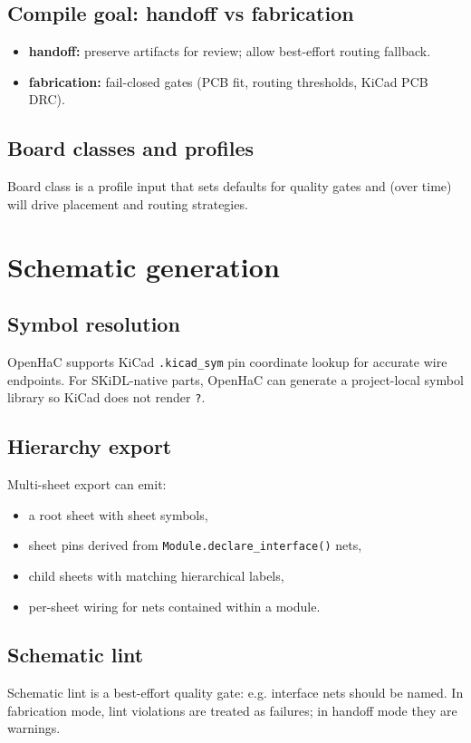 \documentclass[11pt]{report}
\begin{document}
\section{Compile goal: handoff vs fabrication}
\begin{itemize}
  \item \textbf{handoff:} preserve artifacts for review; allow best-effort routing fallback.
  \item \textbf{fabrication:} fail-closed gates (PCB fit, routing thresholds, KiCad PCB DRC).
\end{itemize}

\section{Board classes and profiles}
Board class is a profile input that sets defaults for quality gates and (over time) will drive
placement and routing strategies.

\chapter{Schematic generation}

\section{Symbol resolution}
OpenHaC supports KiCad \texttt{.kicad\_sym} pin coordinate lookup for accurate wire endpoints.
For SKiDL-native parts, OpenHaC can generate a project-local symbol library so KiCad does not render \texttt{?}.

\section{Hierarchy export}
Multi-sheet export can emit:
\begin{itemize}
  \item a root sheet with sheet symbols,
  \item sheet pins derived from \texttt{Module.declare\_interface()} nets,
  \item child sheets with matching hierarchical labels,
  \item per-sheet wiring for nets contained within a module.
\end{itemize}

\section{Schematic lint}
Schematic lint is a best-effort quality gate: e.g. interface nets should be named.
In fabrication mode, lint violations are treated as failures; in handoff mode they are warnings.
\end{document}

